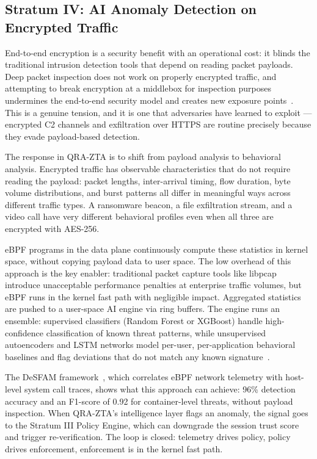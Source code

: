 \documentclass[conference]{IEEEtran}
\begin{document}
\subsection{Stratum IV: AI Anomaly Detection on Encrypted Traffic}

End-to-end encryption is a security benefit with an operational
cost: it blinds the traditional intrusion detection tools that
depend on reading packet payloads. Deep packet inspection does
not work on properly encrypted traffic, and attempting to
break encryption at a middlebox for inspection purposes
undermines the end-to-end security model and creates new
exposure points~\cite{ai_anomaly_det}. This is a genuine
tension, and it is one that adversaries have learned to
exploit --- encrypted C2 channels and exfiltration over HTTPS
are routine precisely because they evade payload-based
detection.

The response in QRA-ZTA is to shift from payload analysis to
behavioral analysis. Encrypted traffic has observable
characteristics that do not require reading the payload:
packet lengths, inter-arrival timing, flow duration, byte
volume distributions, and burst patterns all differ in
meaningful ways across different traffic types. A ransomware
beacon, a file exfiltration stream, and a video call have
very different behavioral profiles even when all three are
encrypted with AES-256.

eBPF programs in the data plane continuously compute these
statistics in kernel space, without copying payload data to
user space. The low overhead of this approach is the key
enabler: traditional packet capture tools like libpcap introduce
unacceptable performance penalties at enterprise traffic
volumes, but eBPF runs in the kernel fast path with negligible
impact. Aggregated statistics are pushed to a user-space AI
engine via ring buffers. The engine runs an ensemble: supervised
classifiers (Random Forest or XGBoost) handle high-confidence
classification of known threat patterns, while unsupervised
autoencoders and LSTM networks model per-user, per-application
behavioral baselines and flag deviations that do not match
any known signature~\cite{ai_anomaly_det}.

The DeSFAM framework~\cite{desfam}, which correlates eBPF
network telemetry with host-level system call traces, shows
what this approach can achieve: 96\% detection accuracy and
an F1-score of 0.92 for container-level threats, without
payload inspection. When QRA-ZTA's intelligence layer flags
an anomaly, the signal goes to the Stratum III Policy Engine,
which can downgrade the session trust score and trigger
re-verification. The loop is closed: telemetry drives
policy, policy drives enforcement, enforcement is in the
kernel fast path.
\end{document}
